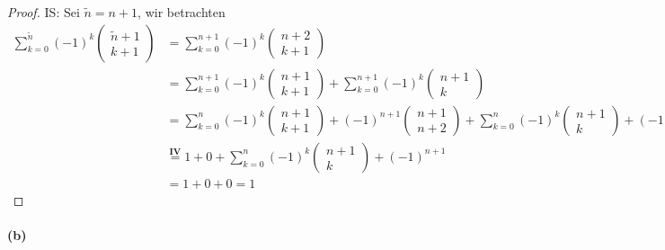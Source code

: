 \begin{proof}
IS: Sei $\tilde{n}=n+1$, wir betrachten
\begin{align*}
\sum_{k=0}^{\tilde{n}}(-1)^k
\begin{pmatrix}
\tilde{n}+1 \\
k+1
\end{pmatrix}
&=
\sum_{k=0}^{n+1}(-1)^k
\begin{pmatrix}
n+2 \\
k+1
\end{pmatrix}\\
&=
\sum_{k=0}^{n+1}(-1)^k
\begin{pmatrix}
n+1 \\
k+1
\end{pmatrix}+
\sum_{k=0}^{n+1}(-1)^k
\begin{pmatrix}
n+1 \\
k
\end{pmatrix}\\
&=
\sum_{k=0}^{n}(-1)^k
\begin{pmatrix}
n+1 \\
k+1
\end{pmatrix}+
(-1)^{n+1}
\begin{pmatrix}
n+1 \\
n+2
\end{pmatrix}+
\sum_{k=0}^{n}(-1)^k
\begin{pmatrix}
n+1 \\
k
\end{pmatrix}+
(-1)^{n+1}
\begin{pmatrix}
n+1 \\
n+1
\end{pmatrix}\\
&\overset{\mathbf{IV}}{=}
1+0+
\sum_{k=0}^{n}(-1)^k
\begin{pmatrix}
n+1 \\
k
\end{pmatrix}+
(-1)^{n+1}\\
&=1+0+0=1
\end{align*}
\end{proof}

\newpage

\paragraph{(b)}
$ $\newline

